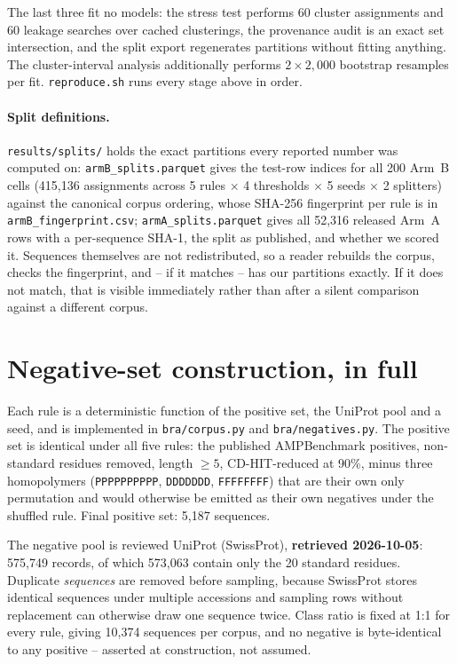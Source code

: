 \documentclass[11pt,a4paper]{article}
\begin{document}
\begin{table}[htbp]
\vspace{3pt}
\footnotesize\raggedright
The last three fit no models: the stress test performs 60 cluster assignments and 60
leakage searches over cached clusterings, the provenance audit is an exact set
intersection, and the split export regenerates partitions without fitting anything. The
cluster-interval analysis additionally performs $2 \times 2{,}000$ bootstrap resamples per
fit. \texttt{reproduce.sh} runs every stage above in order.

\paragraph{Split definitions.} \texttt{results/splits/} holds the exact partitions every
reported number was computed on: \texttt{armB\_splits.parquet} gives the test-row indices
for all 200 Arm~B cells (415{,}136 assignments across 5 rules $\times$ 4 thresholds
$\times$ 5 seeds $\times$ 2 splitters) against the canonical corpus ordering, whose SHA-256
fingerprint per rule is in \texttt{armB\_fingerprint.csv}; \texttt{armA\_splits.parquet}
gives all 52{,}316 released Arm~A rows with a per-sequence SHA-1, the split as published,
and whether we scored it. Sequences themselves are not redistributed, so a reader rebuilds
the corpus, checks the fingerprint, and -- if it matches -- has our partitions exactly. If
it does not match, that is visible immediately rather than after a silent comparison
against a different corpus.
\end{table}

\section{Negative-set construction, in full}
\label{sec:negaudit}

Each rule is a deterministic function of the positive set, the UniProt pool and a seed, and
is implemented in \texttt{bra/corpus.py} and \texttt{bra/negatives.py}. The positive set is
identical under all five rules: the published AMPBenchmark positives, non-standard residues
removed, length $\geq 5$, CD-HIT-reduced at 90\%, minus three homopolymers
(\texttt{PPPPPPPPPP}, \texttt{DDDDDDD}, \texttt{FFFFFFFF}) that are their own only
permutation and would otherwise be emitted as their own negatives under the shuffled rule.
Final positive set: 5{,}187 sequences.

The negative pool is reviewed UniProt (SwissProt), \textbf{retrieved 2026-10-05}: 575{,}749
records, of which 573{,}063 contain only the 20 standard residues. Duplicate \emph{sequences}
are removed before sampling, because SwissProt stores identical sequences under multiple
accessions and sampling rows without replacement can otherwise draw one sequence twice.
Class ratio is fixed at 1:1 for every rule, giving 10{,}374 sequences per corpus, and no
negative is byte-identical to any positive -- asserted at construction, not assumed.
\end{document}
